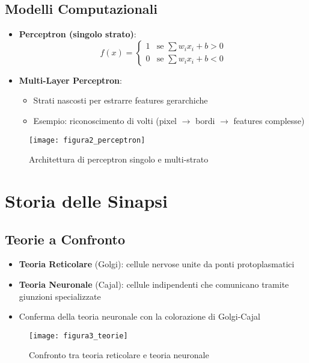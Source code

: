 \documentclass{article}
\begin{document}
\subsection{Modelli Computazionali}
\begin{itemize}
\item \textbf{Perceptron (singolo strato)}:
  \begin{equation*}
    f(x) = \begin{cases} 
      1 & \text{se } \sum w_i x_i + b > 0 \\
      0 & \text{se } \sum w_i x_i + b < 0 
    \end{cases}
  \end{equation*}
\item \textbf{Multi-Layer Perceptron}: 
  \begin{itemize}
  \item Strati nascosti per estrarre features gerarchiche
  \item Esempio: riconoscimento di volti (pixel $\rightarrow$ bordi $\rightarrow$ features complesse)
  \end{itemize}
\end{itemize}

\begin{figure}[h]
\centering
\texttt{[image: figura2\_perceptron]}
\caption{Architettura di perceptron singolo e multi-strato}
\label{fig:perceptron}
\end{figure}

\section{Storia delle Sinapsi}
\subsection{Teorie a Confronto}
\begin{itemize}
\item \textbf{Teoria Reticolare} (Golgi): cellule nervose unite da ponti protoplasmatici
\item \textbf{Teoria Neuronale} (Cajal): cellule indipendenti che comunicano tramite giunzioni specializzate
\item Conferma della teoria neuronale con la colorazione di Golgi-Cajal
\end{itemize}

\begin{figure}[h]
\centering
\texttt{[image: figura3\_teorie]}
\caption{Confronto tra teoria reticolare e teoria neuronale}
\label{fig:teorie}
\end{figure}
\end{document}
